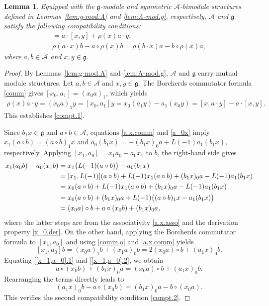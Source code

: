 \documentclass[12pt]{article}
\numberwithin{equation}{section}
\newtheorem{lemma}[theorem]{Lemma}
\theoremstyle{definition}
\theoremstyle{plain}
\newcommand{\fg}{\mathfrak{g}}
\newcommand{\cA}{\ensuremath{\mathcal{A}}}
\begin{document}
\begin{lemma}\label{lem:Lie-Rine}
    Equipped with the $\fg$-module and symmetric $\cA$-bimodule structures defined in Lemmas~\ref{lem:g-mod.A} and \ref{lem:A-mod.g}, respectively, $\cA$ and $\fg$ satisfy the following compatibility conditions\textup{:}
    \begin{gather}
        [x,a\cdot y]=a\cdot [x,y]+\rho(x)a\cdot y,\label{compt.1}\\
        \rho(a\cdot x)b-a\circ\rho(x)b=\rho(b\cdot x)a-b\circ \rho(x)a,\label{compt.2}
    \end{gather}
    where $a,b\in \cA$ and $x,y\in \fg$.
\end{lemma}
\begin{proof}
    By Lemmas~\ref{lem:g-mod.A} and \ref{lem:A-mod.g}, $\cA$ and $\fg$ carry mutual module structures. Let $a,b\in \cA$ and $x,y\in\fg$. The Borcherds commutator formula \eqref{comm} gives $[x_0,a_1]=(x_0a)_1$, which yields
    \begin{align*}
        \rho(x)a\cdot y=(x_0a)_1y=[x_0,a_1]y=x_0(a_1y)-a_1(x_0y)=[x,a\cdot y]-a\cdot[x,y].
    \end{align*}
    This establishes \eqref{compt.1}.

    Since $b_1x\in\fg$ and $a\circ b\in \cA$, equations \eqref{a.x.comm} and \eqref{a_0x} imply $x_1(a\circ b)=(a\circ b)_1x$ and $a_0(b_1x)=-(b_1x)_0a+L(-1)a_1(b_1x)$, respectively. Applying $[x_1,a_0]=x_1a_0-a_0x_1$ to $b$, the right-hand side gives
    \begin{align}
        x_1(a_0b)-a_0(x_1b)&=x_1\big(L(-1)(a\circ b)\big)-a_0(b_1x)\notag\\
        &= [x_1,L(-1)](a\circ b)+L(-1)x_1(a\circ b)+(b_1x)_0a-L(-1)a_1(b_1x)\notag\\
        &=x_0(a\circ b)+L(-1)x_1(a\circ b)+(b_1x)_0a-L(-1)a_1(b_1x)\notag\\
        &=x_0(a\circ b)+(b_1x)_0a+L(-1)\big((a\circ b)_1x-a_1(b_1x)\big)\notag\\
        &=(x_0a)\circ b+a\circ (x_0b)+(b_1x)_0a,\label{[x_1,a_0].1}
    \end{align}
    where the latter steps are from the associativity \eqref{a.x.asso} and the derivation property \eqref{x_0.der}. On the other hand, applying the Borcherds commutator formula to $[x_1, a_0]$ and using \eqref{comm.o} and \eqref{a.x.comm} yields
     \begin{equation}\label{[x_1,a_0].2}
         [x_1,a_0]b=(x_0a)_1b+(x_1a)_0b = 2(x_0a)\circ b+(a_1x)_0b.
     \end{equation}
     Equating \eqref{[x_1,a_0].1} and \eqref{[x_1,a_0].2}, we obtain
     \begin{equation*}
         a\circ (x_0b)+(b_1x)_0a=(x_0a)\circ b+(a_1x)_0b.
     \end{equation*}
     Rearranging the terms directly leads to
     \begin{equation*}
         (a_1x)_0b-a\circ(x_0b)=(b_1x)_0a-b\circ(x_0a).
     \end{equation*}
    This verifies the second compatibility condition \eqref{compt.2}.
\end{proof}
\end{document}
